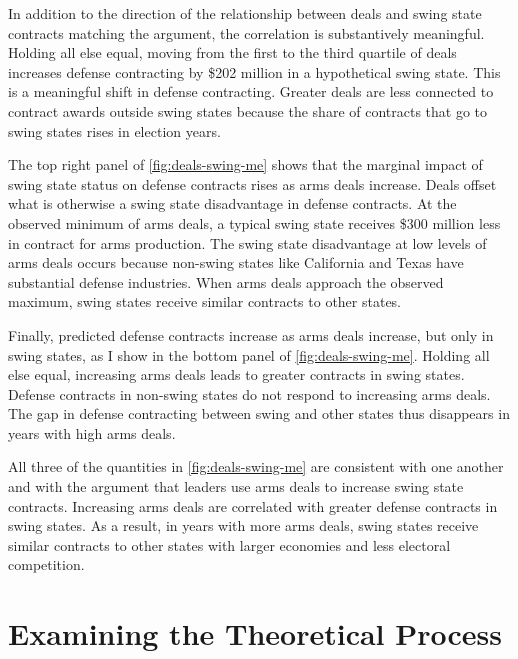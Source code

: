 \documentclass[12pt]{article}
\begin{document}
In addition to the direction of the relationship between deals and swing state contracts matching the argument, the correlation is substantively meaningful. 
Holding all else equal, moving from the first to the third quartile of deals increases defense contracting by \$202 million in a hypothetical swing state. 
This is a meaningful shift in defense contracting. 
Greater deals are less connected to contract awards outside swing states because the share of contracts that go to swing states rises in election years. 


The top right panel of \autoref{fig:deals-swing-me} shows that the marginal impact of swing state status on defense contracts rises as arms deals increase.  
Deals offset what is otherwise a swing state disadvantage in defense contracts. 
At the observed minimum of arms deals, a typical swing state receives \$300 million less in contract for arms production.
The swing state disadvantage at low levels of arms deals occurs because non-swing states like California and Texas have substantial defense industries.
When arms deals approach the observed maximum, swing states receive similar contracts to other states. 


Finally, predicted defense contracts increase as arms deals increase, but only in swing states, as I show in the bottom panel of \autoref{fig:deals-swing-me}. 
Holding all else equal, increasing arms deals leads to greater contracts in swing states. 
Defense contracts in non-swing states do not respond to increasing arms deals.
The gap in defense contracting between swing and other states thus disappears in years with high arms deals. 


All three of the quantities in  \autoref{fig:deals-swing-me} are consistent with one another and with the argument that leaders use arms deals to increase swing state contracts. 
Increasing arms deals are correlated with greater defense contracts in swing states. 
As a result, in years with more arms deals, swing states receive similar contracts to other states with larger economies and less electoral competition.


\section{Examining the Theoretical Process}
\end{document}
